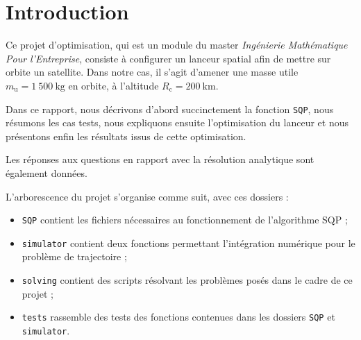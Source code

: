 \section{Introduction}

Ce projet d'optimisation, qui est un module du master \emph{Ingénierie Mathématique Pour l'Entreprise}, consiste à configurer un lanceur spatial afin de mettre sur orbite un satellite. Dans notre cas, il s'agit d'amener une masse utile $m_{\textrm{u}}=1~500~\textrm{kg}$ en orbite, à l'altitude $R_{\textrm{c}}=200~\textrm{km}$.

Dans ce rapport, nous décrivons d'abord succinctement la fonction \lstinline+SQP+, nous résumons les cas tests, nous expliquons ensuite l'optimisation du lanceur et nous présentons enfin les résultats issus de cette optimisation.

Les réponses aux questions en rapport avec la résolution analytique sont également données.

\vspace{2cm}

L'arborescence du projet s'organise comme suit, avec ces dossiers :
\vspace{1cm}
\begin{itemize}
\item\lstinline+SQP+ contient les fichiers nécessaires au fonctionnement de l'algorithme SQP ;
\item\lstinline+simulator+ contient deux fonctions permettant l'intégration numérique pour le problème de trajectoire ;
\item\lstinline+solving+ contient des scripts résolvant les problèmes posés dans le cadre de ce projet ;
\item\lstinline+tests+ rassemble des tests des fonctions contenues dans les dossiers \lstinline+SQP+ et \lstinline+simulator+.
\end{itemize}
